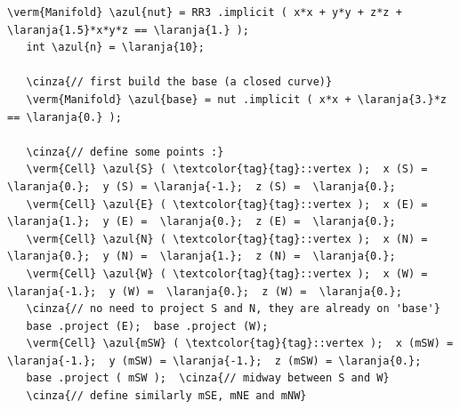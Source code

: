 \begin{Verbatim}[commandchars=\\\{\},formatcom=\small\tt,frame=single,
   label=parag-\ref{\numb section 2.\numb parag 17}.cpp,rulecolor=\color{moldura},
   baselinestretch=0.94,framesep=2mm]
   \verm{Manifold} \azul{nut} = RR3 .implicit ( x*x + y*y + z*z + \laranja{1.5}*x*y*z == \laranja{1.} );
   int \azul{n} = \laranja{10};

   \cinza{// first build the base (a closed curve)}
   \verm{Manifold} \azul{base} = nut .implicit ( x*x + \laranja{3.}*z == \laranja{0.} );

   \cinza{// define some points :}
   \verm{Cell} \azul{S} ( \textcolor{tag}{tag}::vertex );  x (S) =  \laranja{0.};  y (S) = \laranja{-1.};  z (S) =  \laranja{0.};
   \verm{Cell} \azul{E} ( \textcolor{tag}{tag}::vertex );  x (E) =  \laranja{1.};  y (E) =  \laranja{0.};  z (E) =  \laranja{0.};
   \verm{Cell} \azul{N} ( \textcolor{tag}{tag}::vertex );  x (N) =  \laranja{0.};  y (N) =  \laranja{1.};  z (N) =  \laranja{0.};
   \verm{Cell} \azul{W} ( \textcolor{tag}{tag}::vertex );  x (W) = \laranja{-1.};  y (W) =  \laranja{0.};  z (W) =  \laranja{0.};
   \cinza{// no need to project S and N, they are already on 'base'}
   base .project (E);  base .project (W);
   \verm{Cell} \azul{mSW} ( \textcolor{tag}{tag}::vertex );  x (mSW) = \laranja{-1.};  y (mSW) = \laranja{-1.};  z (mSW) = \laranja{0.};
   base .project ( mSW );  \cinza{// midway between S and W}
   \cinza{// define similarly mSE, mNE and mNW}


\end{Verbatim}
